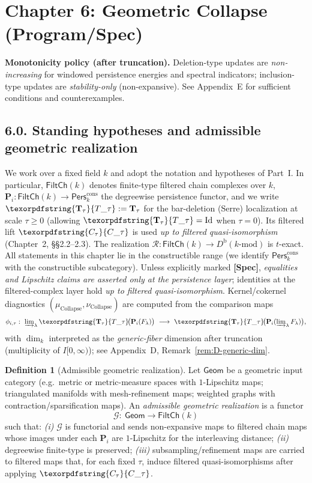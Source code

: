 \documentclass[11pt]{article}
\numberwithin{equation}{section}
\theoremstyle{plain}
\theoremstyle{definition}
\theoremstyle{remark}
\DeclareRobustCommand{\hyp}{\nobreakdash-}
\newcommand{\Pers}{\mathsf{Pers}}
\newcommand{\Rfun}{\mathcal{R}}
\theoremstyle{plain}
\theoremstyle{definition}
\numberwithin{equation}{section}
\theoremstyle{definition}
\newtheorem{definition}[theorem]{Definition}
\DeclareRobustCommand{\FiltCh}[1]{\mathsf{FiltCh}(#1)}
\DeclareRobustCommand{\Perskft}{\Pers^{\mathrm{cons}}_{k}}
\DeclareRobustCommand{\Ttau}{\texorpdfstring{\ensuremath{\mathbf{T}_{\tau}}}{T\_\tau}}
\DeclareRobustCommand{\Ctau}{\texorpdfstring{\ensuremath{C_{\tau}}}{C\_\tau}}
\DeclareRobustCommand{\muc}{\mu_{\mathrm{Collapse}}}
\DeclareRobustCommand{\nuc}{\nu_{\mathrm{Collapse}}}
\numberwithin{equation}{section}
\theoremstyle{plain}
\theoremstyle{definition}
\theoremstyle{remark}
\providecommand{\Cfun}[1]{\mathsf{C}_{#1}}
\providecommand{\Tfun}[1]{\mathbf{T}_{#1}}
\providecommand{\Ctau}{\Cfun{\tau}}
\providecommand{\Ttau}{\Tfun{\tau}}
\providecommand{\muc}{\mu_{\mathrm{Collapse}}}
\providecommand{\nuc}{\nu_{\mathrm{Collapse}}}
\begin{document}
\section{Chapter 6: Geometric Collapse (Program/Spec)}

\noindent\textbf{Monotonicity policy (after truncation).} Deletion\hyp type updates are \emph{non\hyp increasing} for windowed persistence energies and spectral indicators; inclusion\hyp type updates are \emph{stability\hyp only} (non\hyp expansive). See Appendix~E for sufficient conditions and counterexamples.

\subsection*{6.0. Standing hypotheses and admissible geometric realization}
We work over a fixed field \(k\) and adopt the notation and hypotheses of Part~I. In particular,
\(\FiltCh{k}\) denotes finite\hyp type filtered chain complexes over \(k\),
\(\mathbf{P}_i:\FiltCh{k}\to\Perskft\) the degreewise persistence functor,
and we write \(\Ttau:=\mathbf{T}_\tau\) for the bar\hyp deletion (Serre) localization at scale \(\tau\ge 0\) (allowing \(\Ttau=\mathrm{Id}\) when \(\tau=0\)).
Its filtered lift \(\Ctau\) is used \emph{up to filtered quasi\hyp isomorphism} (Chapter~2, §§2.2–2.3).
The realization \(\Rfun:\FiltCh{k}\to D^{\mathrm{b}}(k\text{-mod})\) is \(t\)\hyp exact.
All statements in this chapter lie in the constructible range (we identify \(\Perskft\) with the constructible subcategory).
Unless explicitly marked \textbf{[Spec]}, \emph{equalities and Lipschitz claims are asserted only at the persistence layer}; identities at the filtered\hyp complex layer hold \emph{up to filtered quasi\hyp isomorphism}.
Kernel/cokernel diagnostics \((\muc,\nuc)\) are computed from the comparison maps
\[
  \phi_{i,\tau}:\ \varinjlim\nolimits_\lambda \Ttau\!\big(\mathbf{P}_i(F_\lambda)\big)\ \longrightarrow\ \Ttau\!\big(\mathbf{P}_i(\varinjlim\nolimits_\lambda F_\lambda)\big),
\]
with \(\dim_k\) interpreted as the \emph{generic\hyp fiber} dimension after truncation (multiplicity of \(I[0,\infty)\)); see Appendix~D, Remark~\ref{rem:D-generic-dim}.

\begin{definition}[Admissible geometric realization]\label{def:geom-real}
Let \(\mathsf{Geom}\) be a geometric input category (e.g.\ metric or metric\hyp measure spaces with \(1\)\hyp Lipschitz maps; triangulated manifolds with mesh\hyp refinement maps; weighted graphs with contraction/sparsification maps). An \emph{admissible geometric realization} is a functor
\[
  \mathcal{G}:\ \mathsf{Geom}\longrightarrow \FiltCh{k}
\]
such that:
\emph{(i)} \(\mathcal{G}\) is functorial and sends non\hyp expansive maps to filtered chain maps whose images under each \(\mathbf{P}_i\) are \(1\)\hyp Lipschitz for the interleaving distance;
\emph{(ii)} degreewise finite\hyp type is preserved;
\emph{(iii)} subsampling/refinement maps are carried to filtered maps that, for each fixed \(\tau\), induce filtered quasi\hyp isomorphisms after applying \(\Ctau\).
\end{definition}
\end{document}
